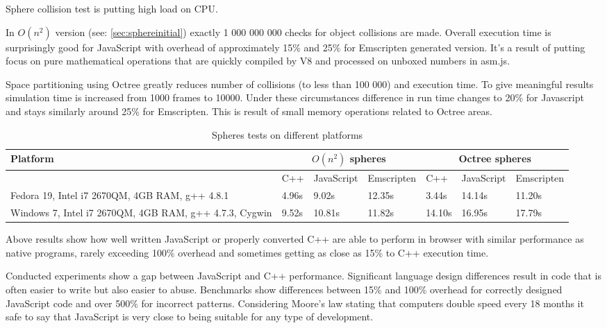 Sphere collision test is putting high load on CPU. 

In $O(n^2)$ version (see: \ref{sec:sphereinitial}) exactly 1 000 000 000 checks for object collisions are made. Overall execution time is surprisingly good for JavaScript with overhead of approximately 15\% and 25\% for Emscripten generated version. It's a result of putting focus on pure mathematical operations that are quickly compiled by V8 and processed on unboxed numbers in asm.js.

Space partitioning using Octree greatly reduces number of collisions (to less than 100 000) and execution time. To give meaningful results simulation time is increased from 1000 frames to 10000. Under these circumstances difference in run time changes to 20\% for Javascript and stays similarly around 25\% for Emscripten. This is result of small memory operations related to Octree areas.

\begin{table}[h!]
\caption{Spheres tests on different platforms}
\label{table:benchmarks}
\begin{tabular}{|p{4cm}||l|l|l||l|l|l|}
   \hline
   Platform & \multicolumn{3}{c}{$O(n^2)$ spheres} & \multicolumn{3}{c}{Octree spheres}\\ \hline
   & C++ & JavaScript & Emscripten & C++ & JavaScript & Emscripten\\ \hline
   Fedora 19, Intel i7 2670QM, 4GB RAM, g++ 4.8.1 & 4.96s & 9.02s & 12.35s & 
3.44s & 14.14s & 11.20s \\ \hline
   Windows 7, Intel i7 2670QM, 4GB RAM, g++ 4.7.3, Cygwin & 9.52s & 10.81s & 11.82s & 14.10s & 16.95s & 17.79s \\\hline
\end{tabular}
\end{table}

Above results show how well written JavaScript or properly converted C++ are able to perform in browser with similar performance as native programs, rarely exceeding 100\% overhead and sometimes getting as close as 15\% to C++ execution time. 

Conducted experiments show a gap between JavaScript and C++ performance. Significant language design differences result in code that is often easier to write but also easier to abuse. Benchmarks show differences between 15\% and 100\% overhead for correctly designed JavaScript code and over 500\% for incorrect patterns.  Considering Moore's law stating that computers double speed every 18 months it safe to say that JavaScript is very close to being suitable for any type of development.

